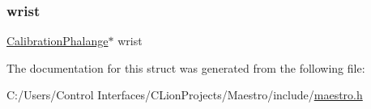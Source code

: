 \mbox{\label{struct_calibration_context_a6c207403d305e2cdfea2fb0676209261}} 
\subsubsection{\texorpdfstring{wrist}{wrist}}
{\footnotesize\ttfamily \hyperlink{maestro_8h_a09681c098cfa56729e216f222d0486b2}{Calibration\+Phalange}$\ast$ wrist}



The documentation for this struct was generated from the following file\+:\begin{DoxyCompactItemize}
\item 
C\+:/\+Users/\+Control Interfaces/\+C\+Lion\+Projects/\+Maestro/include/\hyperlink{maestro_8h}{maestro.\+h}\end{DoxyCompactItemize}
